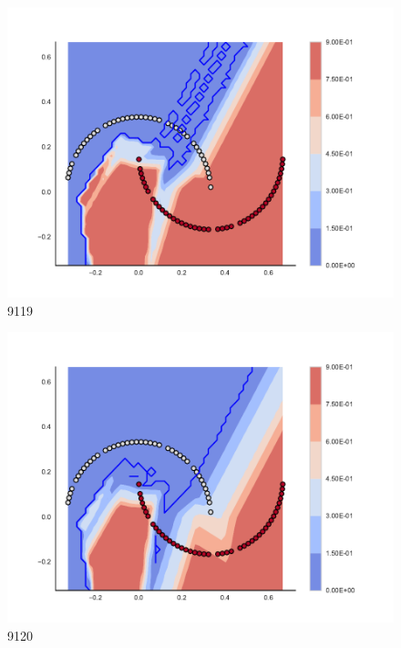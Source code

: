 \begin{subfigure}[b]{0.09\textwidth}
    \includegraphics[clip, trim=2.35cm 1.75cm 4.5cm 0cm,width=\textwidth]{img/convergence/9119.pdf}
    \caption{9119}
    \label{fig:convergence_9119}
\end{subfigure}
%
\begin{subfigure}[b]{0.09\textwidth}
    \includegraphics[clip, trim=2.35cm 1.75cm 4.5cm 0cm,width=\textwidth]{img/convergence/9120.pdf}
    \caption{9120}
    \label{fig:convergence_9120}
\end{subfigure}
%

